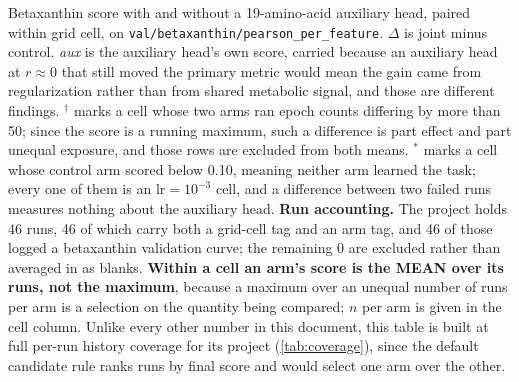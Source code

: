 \begin{table}[htbp]
\caption[]{Betaxanthin score with and without a 19-amino-acid auxiliary head, paired within grid cell, on \texttt{val/betaxanthin/pearson\_per\_feature}. $\Delta$ is joint minus control. \emph{aux} is the auxiliary head's own score, carried because an auxiliary head at $r \approx 0$ that still moved the primary metric would mean the gain came from regularization rather than from shared metabolic signal, and those are different findings. $^{\dagger}$ marks a cell whose two arms ran epoch counts differing by more than 50; since the score is a running maximum, such a difference is part effect and part unequal exposure, and those rows are excluded from both means. $^{\ast}$ marks a cell whose control arm scored below 0.10, meaning neither arm learned the task; every one of them is an $\mathrm{lr} = 10^{-3}$ cell, and a difference between two failed runs measures nothing about the auxiliary head. \textbf{Run accounting.} The project holds 46 runs, 46 of which carry both a grid-cell tag and an arm tag, and 46 of those logged a betaxanthin validation curve; the remaining 0 are excluded rather than averaged in as blanks. \textbf{Within a cell an arm's score is the MEAN over its runs, not the maximum}, because a maximum over an unequal number of runs per arm is a selection on the quantity being compared; $n$ per arm is given in the cell column. Unlike every other number in this document, this table is built at full per-run history coverage for its project (\cref{tab:coverage}), since the default candidate rule ranks runs by final score and would select one arm over the other.}
\label{tab:bx-aa-paired}
\end{table}
